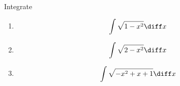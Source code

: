 Integrate
\begin{enumerate}[ref={\fcProblemRef}]
\item 
\[
\int \sqrt{1-x^2}\diff x
\]
\item 
\[
\int \sqrt{2-x^2}\diff x
\]
\item 
\[
\int \sqrt{-x^2+x+1}\diff x
\]
\end{enumerate}
